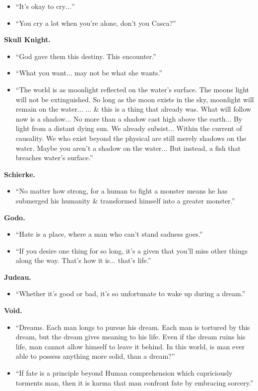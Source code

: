 \documentclass{article}
\begin{document}
\begin{enumerate}
\begin{itemize}
		\item ``It's okay to cry$\ldots$''
		\item ``You cry a lot when you're alone, don't you Casca?''
	\end{itemize}
	{\bf Skull Knight.}
	\begin{itemize}
		\item ``God gave them this destiny. This encounter.''
		\item ``What you want$\ldots$ may not be what she wants.''
		\item ``The world is as moonlight reflected on the water's surface. The moons light will not be extinguished. So long as the moon exists in the sky, moonlight will remain on the water$\ldots$ $\ldots$ \& this is a thing that already was. What will follow now is a shadow$\ldots$ No more than a shadow cast high above the earth$\ldots$ By light from a distant dying sun. We already subsist$\ldots$ Within the current of causality. We who exist beyond the physical are still merely shadows on the water. Maybe you aren't a shadow on the water$\ldots$ But instead, a fish that breaches water's surface.''
	\end{itemize}
	{\bf Schierke.}
	\begin{itemize}
		\item ``No matter how strong, for a human to fight a monster means he has submerged his humanity \& transformed himself into a greater monster.''
	\end{itemize}
	{\bf Godo.}
	\begin{itemize}
		\item ``Hate is a place, where a man who can't stand sadness goes.''
		\item ``If you desire one thing for so long, it's a given that you'll miss other things along the way. That's how it is$\ldots$ that's life.''
	\end{itemize}
	{\bf Judeau.}
	\begin{itemize}
		\item ``Whether it's good or bad, it's so unfortunate to wake up during a dream.''
	\end{itemize}
	{\bf Void.}
	\begin{itemize}
		\item ``Dreams. Each man longs to pursue his dream. Each man is tortured by this dream, but the dream gives meaning to his life. Even if the dream ruins his life, man cannot allow himself to leave it behind. In this world, is man ever able to possess anything more solid, than a dream?''
		\item ``If fate is a principle beyond Human comprehension which capriciously torments man, then it is karma that man confront fate by embracing sorcery.''

\end{itemize}
\end{enumerate}
\end{document}
